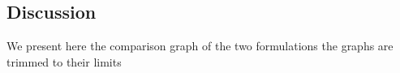 \begin{figure}[]
    \hspace*{\fill}
    \hfill
    \hspace*{\fill}
    \caption{}
    \label{fig:03_tto_plot}
\end{figure}

\subsection{Discussion}
We present here the comparison graph of the two formulations
the graphs are trimmed to their limits
